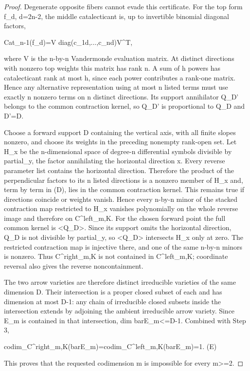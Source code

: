 \documentclass{article}
\begin{document}
\begin{proof}
Degenerate opposite fibers cannot evade this certificate. For the top form f_d, d=2n-2, the middle catalecticant is, up to invertible binomial diagonal factors,

Cat_{n-1}(f_d)=V diag(c_{1d},...,c_{nd})V^T,

where V is the n-by-n Vandermonde evaluation matrix. At distinct directions with nonzero top weights this matrix has rank n. A sum of h powers has catalecticant rank at most h, since each power contributes a rank-one matrix. Hence any alternative representation using at most n listed terms must use exactly n nonzero terms on n distinct directions. Its support annihilator Q_{D'} belongs to the common contraction kernel, so Q_{D'} is proportional to Q_D and D'=D.

Choose a forward support D containing the vertical axis, with all finite slopes nonzero, and choose its weights in the preceding nonempty rank-open set. Let H_x be the n-dimensional space of degree-n differential symbols divisible by partial_y, the factor annihilating the horizontal direction x. Every reverse parameter list contains the horizontal direction. Therefore the product of the perpendicular factors to its n listed directions is a nonzero member of H_x and, term by term in (D), lies in the common contraction kernel. This remains true if directions coincide or weights vanish. Hence every n-by-n minor of the stacked contraction map restricted to H_x vanishes polynomially on the whole reverse image and therefore on C^left_{m,K}. For the chosen forward point the full common kernel is <Q_D>. Since its support omits the horizontal direction, Q_D is not divisible by partial_y, so <Q_D> intersects H_x only at zero. The restricted contraction map is injective there, and one of the same n-by-n minors is nonzero. Thus C^right_{m,K} is not contained in C^left_{m,K}; coordinate reversal also gives the reverse noncontainment.

The two arrow varieties are therefore distinct irreducible varieties of the same dimension D. Their intersection is a proper closed subset of each and has dimension at most D-1: any chain of irreducible closed subsets inside the intersection extends by adjoining the ambient irreducible arrow variety. Since E_m is contained in that intersection, dim barE_m<=D-1. Combined with Step 3,

codim_{C^right_{m,K}}(barE_m)=codim_{C^left_{m,K}}(barE_m)=1.                 (E)

This proves that the requested codimension m is impossible for every m>=2.


\end{proof}
\end{document}
